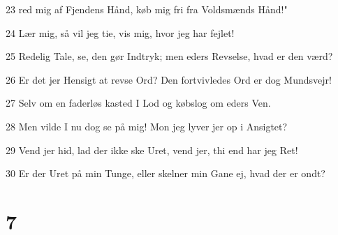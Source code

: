 \par 23 red mig af Fjendens Hånd, køb mig fri fra Voldsmænds Hånd!"
\par 24 Lær mig, så vil jeg tie, vis mig, hvor jeg har fejlet!
\par 25 Redelig Tale, se, den gør Indtryk; men eders Revselse, hvad er den værd?
\par 26 Er det jer Hensigt at revse Ord? Den fortvivledes Ord er dog Mundsvejr!
\par 27 Selv om en faderløs kasted I Lod og købslog om eders Ven.
\par 28 Men vilde I nu dog se på mig! Mon jeg lyver jer op i Ansigtet?
\par 29 Vend jer hid, lad der ikke ske Uret, vend jer, thi end har jeg Ret!
\par 30 Er der Uret på min Tunge, eller skelner min Gane ej, hvad der er ondt?

\chapter{7}

